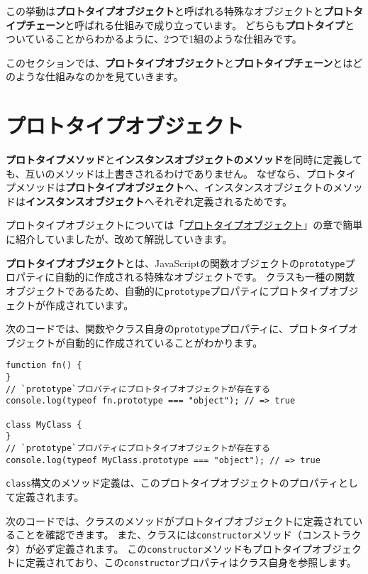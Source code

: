 この挙動は\textbf{プロトタイプオブジェクト}と呼ばれる特殊なオブジェクトと\textbf{プロトタイプチェーン}と呼ばれる仕組みで成り立っています。
どちらも\textbf{プロトタイプ}とついていることからわかるように、2つで1組のような仕組みです。

このセクションでは、\textbf{プロトタイプオブジェクト}と\textbf{プロトタイプチェーン}とはどのような仕組みなのかを見ていきます。

\hypertarget{prototype}{%
\section{プロトタイプオブジェクト}\label{prototype}}

\textbf{プロトタイプメソッド}と\textbf{インスタンスオブジェクトのメソッド}を同時に定義しても、互いのメソッドは上書きされるわけでありません。
なぜなら、プロトタイプメソッドは\textbf{プロトタイプオブジェクト}へ、インスタンスオブジェクトのメソッドは\textbf{インスタンスオブジェクト}へそれぞれ定義されるためです。

プロトタイプオブジェクトについては「\href{../prototype-object/README.md}{プロトタイプオブジェクト}」の章で簡単に紹介していましたが、改めて解説していきます。

\textbf{プロトタイプオブジェクト}とは、JavaScriptの関数オブジェクトの\texttt{prototype}プロパティに自動的に作成される特殊なオブジェクトです。
クラスも一種の関数オブジェクトであるため、自動的に\texttt{prototype}プロパティにプロトタイプオブジェクトが作成されています。

次のコードでは、関数やクラス自身の\texttt{prototype}プロパティに、プロトタイプオブジェクトが自動的に作成されていることがわかります。

\begin{lstlisting}
function fn() {
}
// `prototype`プロパティにプロトタイプオブジェクトが存在する
console.log(typeof fn.prototype === "object"); // => true

class MyClass {
}
// `prototype`プロパティにプロトタイプオブジェクトが存在する
console.log(typeof MyClass.prototype === "object"); // => true
\end{lstlisting}

\texttt{class}構文のメソッド定義は、このプロトタイプオブジェクトのプロパティとして定義されます。

次のコードでは、クラスのメソッドがプロトタイプオブジェクトに定義されていることを確認できます。
また、クラスには\texttt{constructor}メソッド（コンストラクタ）が必ず定義されます。
この\texttt{constructor}メソッドもプロトタイプオブジェクトに定義されており、この\texttt{constructor}プロパティはクラス自身を参照します。

